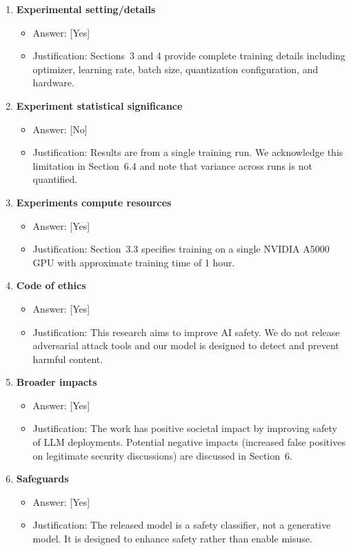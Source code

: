 \documentclass[11pt]{article}
\begin{document}
\begin{enumerate}[leftmargin=*]
\item \textbf{Experimental setting/details}
\begin{itemize}
  \item[] Answer: [Yes]
  \item[] Justification: Sections~3 and 4 provide complete training details including optimizer, learning rate, batch size, quantization configuration, and hardware.
\end{itemize}

\item \textbf{Experiment statistical significance}
\begin{itemize}
  \item[] Answer: [No]
  \item[] Justification: Results are from a single training run. We acknowledge this limitation in Section~6.4 and note that variance across runs is not quantified.
\end{itemize}

\item \textbf{Experiments compute resources}
\begin{itemize}
  \item[] Answer: [Yes]
  \item[] Justification: Section~3.3 specifies training on a single NVIDIA A5000 GPU with approximate training time of 1 hour.
\end{itemize}

\item \textbf{Code of ethics}
\begin{itemize}
  \item[] Answer: [Yes]
  \item[] Justification: This research aims to improve AI safety. We do not release adversarial attack tools and our model is designed to detect and prevent harmful content.
\end{itemize}

\item \textbf{Broader impacts}
\begin{itemize}
  \item[] Answer: [Yes]
  \item[] Justification: The work has positive societal impact by improving safety of LLM deployments. Potential negative impacts (increased false positives on legitimate security discussions) are discussed in Section~6.
\end{itemize}

\item \textbf{Safeguards}
\begin{itemize}
  \item[] Answer: [Yes]
  \item[] Justification: The released model is a safety classifier, not a generative model. It is designed to enhance safety rather than enable misuse.
\end{itemize}


\end{enumerate}
\end{document}
